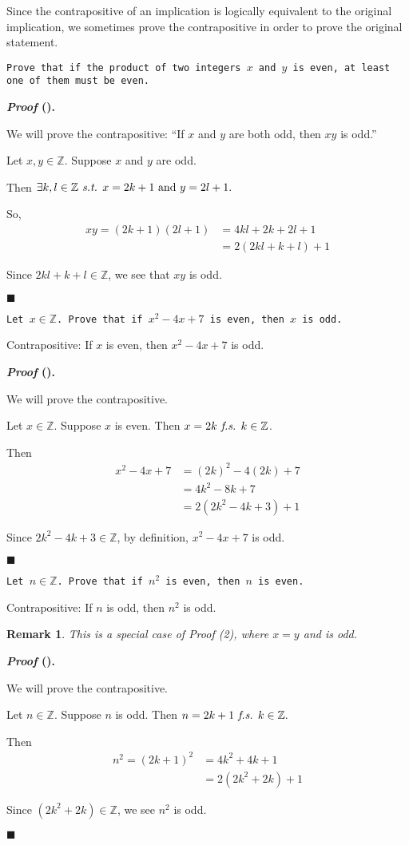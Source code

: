 \documentclass[12pt,a4paper]{article}
\newcounter{nprf}[subsection]
\newtheorem*{rmk}{\indent Remark}
\newenvironment*{prf}{\par\indent\textbf{\textit{Proof} (\stepcounter{nprf}\thenprf). }\par}{\par\hfill $\blacksquare$\par}
\def\Z{{\mathbb{Z}}}
\def\st{\emph{ s.t. }}
\def\fs{\emph{ f.s. }}
\begin{document}
Since the contrapositive of an implication is logically equivalent to the original implication, we sometimes prove the contrapositive in order to prove the original statement. 
\begin{framed}
\noindent\texttt{Prove that if the product of two integers $x$ and $y$ is even, at least one of them must be even.}
\begin{prf}
	We will prove the contrapositive: ``If $x$ and $y$ are both odd, then $xy$ is odd.''\par Let $x,y\in\Z$. Suppose $x$ and $y$ are odd.\par Then $\exists k,l\in\Z\st x=2k+1\text{ and }y=2l+1.$\par So, \[\begin{aligned}
		xy=(2k+1)(2l+1)&=4kl+2k+2l+1\\&=2(2kl+k+l)+1
	\end{aligned}\]\par Since $2kl+k+l\in\Z$, we see that $xy$ is odd.
\end{prf}	
\end{framed}
\begin{framed}
\noindent\texttt{Let $x\in\Z$. Prove that if $x^2-4x+7$ is even, then $x$ is odd. }\par
Contrapositive: If $x$ is even, then $x^2-4x+7$ is odd.
\begin{prf}
	We will prove the contrapositive.\par Let $x\in\Z$. Suppose $x$ is even. Then $x=2k\fs k\in\Z$.\par Then \[\begin{aligned}
		x^2-4x+7&=(2k)^2-4(2k)+7\\&=4k^2-8k+7\\&=2(2k^2-4k+3)+1
	\end{aligned}\]\par Since $2k^2-4k+3\in\Z$, by definition, $x^2-4x+7$ is odd. 
\end{prf}
\end{framed}
\begin{framed}
\noindent\texttt{Let $n\in\Z$. Prove that if $n^2$ is even, then $n$ is even.}\par 
Contrapositive: If $n$ is odd, then $n^2$ is odd. 
\begin{rmk}	This is a special case of Proof (2), where $x=y$ and is odd.\end{rmk}
\begin{prf}
	We will prove the contrapositive.\par Let $n\in\Z$. Suppose $n$ is odd. Then $n=2k+1\fs k\in\Z.$\par Then \[\begin{aligned}
		n^2=(2k+1)^2&=4k^2+4k+1\\&=2(2k^2+2k)+1
	\end{aligned}\]\par Since $(2k^2+2k)\in\Z$, we see $n^2$ is odd. 
\end{prf}
\end{framed}
\end{document}
